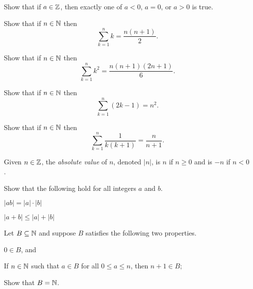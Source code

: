 \begin{exercise}[Trichotomy.]
Show that if \(a \in \mathbb{Z}\), then exactly one of \(a < 0\), \(a = 0\), or \(a > 0\) is true.
\end{exercise}

\begin{exercise}
Show that if \(n \in \mathbb{N}\) then \[ \sum_{k=1}^n k = \frac{n(n+1)}{2}. \]
\end{exercise}

\begin{exercise}
Show that if \(n \in \mathbb{N}\) then \[ \sum_{k=1}^n k^2 = \frac{n(n+1)(2n+1)}{6}. \]
\end{exercise}

\begin{exercise}
Show that if \(n \in \mathbb{N}\) then \[ \sum_{k=1}^n (2k - 1) = n^2. \]
\end{exercise}

\begin{exercise}
Show that if \(n \in \mathbb{N}\) then \[ \sum_{k=1}^n \frac{1}{k(k+1)} = \frac{n}{n+1}. \]
\end{exercise}

\begin{dfn}
Given \(n \in \mathbb{Z}\), the \emph{absolute value} of \(n\), denoted \(|n|\), is \(n\) if \(n \geq 0\) and is \(-n\) if \(n < 0\).
\end{dfn}

\begin{exercise}
Show that the following hold for all integers \(a\) and \(b\).
\begin{proplist}
\item \(|ab| = |a| \cdot |b|\)
\item \(|a+b| \leq |a| + |b|\)
\end{proplist}
\end{exercise}

\begin{exercise}
Let \(B \subseteq \mathbb{N}\) and suppose \(B\) satisfies the following two properties.
\begin{proplist}
\item \(0 \in B\), and
\item If \(n \in \mathbb{N}\) such that \(a \in B\) for all \(0 \leq a \leq n\), then \(n+1 \in B\);
\end{proplist}
Show that \(B = \mathbb{N}\).
\end{exercise}
